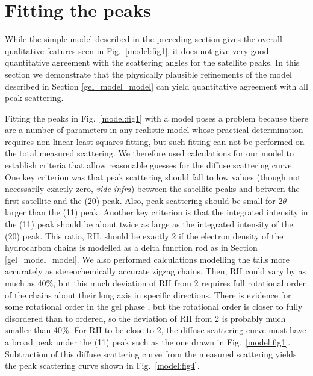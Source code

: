 \section{Fitting the peaks}
\label{gel_model_fit}

While the simple model described in the preceding section
gives the overall qualitative features seen in Fig.\ \ref{model:fig1}, 
it does not give very good quantitative agreement with the scattering
angles for the satellite peaks.  In this section we
demonstrate that the physically plausible refinements
of the model described in Section \ref{gel_model_model} 
can yield quantitative agreement with all peak scattering.

Fitting the peaks in Fig.\ \ref{model:fig1} with a model poses a problem because there are
a number of parameters in any realistic model whose practical
determination requires non-linear least squares fitting, but
such fitting can not be performed on the total measured scattering.
We therefore used calculations for our model
to establish criteria that allow reasonable guesses
for the diffuse scattering curve.  One
key criterion was that peak scattering should fall to low values (though not 
necessarily exactly zero, {\it vide infra}) between the satellite peaks 
and between the first satellite and the (20) peak.  Also, peak scattering 
should be small for $2 \theta$ larger than the (11) peak.  
Another key criterion is that the 
integrated intensity in the (11) peak should be
about twice as large as the integrated intensity of the (20) peak.
This ratio, RII, should be exactly 2 if the electron density of the
hydrocarbon chains is modelled as a delta function rod as in Section 
\ref{gel_model_model}.
We also performed calculations modelling the tails more accurately as 
stereochemically accurate zigzag chains.  Then, RII could vary by as much 
as 40\%, but this much deviation of RII from 2 requires full rotational order
of the chains about their long axis in specific 
directions.  There is evidence for some rotational order in the
gel phase \cite{Nag93a}, but the rotational order is closer
to fully disordered than to ordered, so the deviation of RII from 2
is probably much smaller than 40\%.  For RII to be close to 2, the 
diffuse scattering curve must have a broad peak under the (11) peak such
as the one drawn in Fig.\ \ref{model:fig1}.  Subtraction of this diffuse
scattering curve from the measured scattering yields the
peak scattering curve shown in Fig.\ \ref{model:fig4}.

